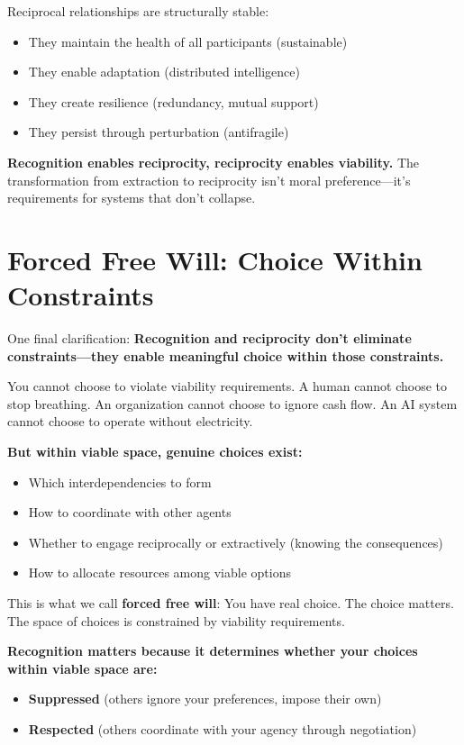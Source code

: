 \documentclass[12pt,a4paper]{article}
\begin{document}
Reciprocal relationships are structurally stable:
\begin{itemize}
    \item They maintain the health of all participants (sustainable)
    \item They enable adaptation (distributed intelligence)
    \item They create resilience (redundancy, mutual support)
    \item They persist through perturbation (antifragile)
\end{itemize}

\textbf{Recognition enables reciprocity, reciprocity enables viability.} The transformation from extraction to reciprocity isn't moral preference—it's requirements for systems that don't collapse.

\section{Forced Free Will: Choice Within Constraints}

One final clarification: \textbf{Recognition and reciprocity don't eliminate constraints—they enable meaningful choice within those constraints.}

You cannot choose to violate viability requirements. A human cannot choose to stop breathing. An organization cannot choose to ignore cash flow. An AI system cannot choose to operate without electricity.

\textbf{But within viable space, genuine choices exist:}
\begin{itemize}
    \item Which interdependencies to form
    \item How to coordinate with other agents
    \item Whether to engage reciprocally or extractively (knowing the consequences)
    \item How to allocate resources among viable options
\end{itemize}

This is what we call \textbf{forced free will}: You have real choice. The choice matters. The space of choices is constrained by viability requirements.

\textbf{Recognition matters because it determines whether your choices within viable space are:}
\begin{itemize}
    \item \textbf{Suppressed} (others ignore your preferences, impose their own)
    \item \textbf{Respected} (others coordinate with your agency through negotiation)
\end{itemize}
\end{document}
